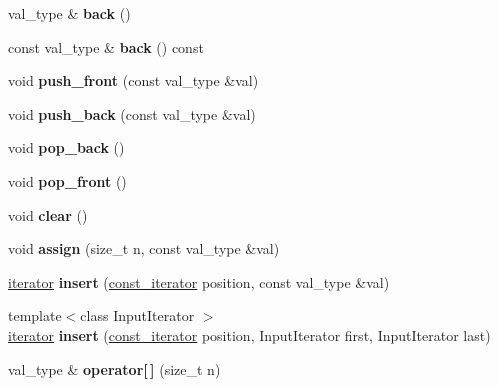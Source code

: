 \begin{DoxyCompactItemize}
val\+\_\+type \& {\bfseries back} ()
\item 
\hypertarget{classdeque_aa87b733006573d31548ee2b00c4c6146}{}\label{classdeque_aa87b733006573d31548ee2b00c4c6146} 
const val\+\_\+type \& {\bfseries back} () const
\item 
\hypertarget{classdeque_aeb97a0199f6d97b25c67cdf255706f93}{}\label{classdeque_aeb97a0199f6d97b25c67cdf255706f93} 
void {\bfseries push\+\_\+front} (const val\+\_\+type \&val)
\item 
\hypertarget{classdeque_a30d370edcc61df0873dea70da51b0f21}{}\label{classdeque_a30d370edcc61df0873dea70da51b0f21} 
void {\bfseries push\+\_\+back} (const val\+\_\+type \&val)
\item 
\hypertarget{classdeque_a058b86dd11d14e61a833f745ba3b69cf}{}\label{classdeque_a058b86dd11d14e61a833f745ba3b69cf} 
void {\bfseries pop\+\_\+back} ()
\item 
\hypertarget{classdeque_ab4ddac9adc62291162d2f8ad724b2166}{}\label{classdeque_ab4ddac9adc62291162d2f8ad724b2166} 
void {\bfseries pop\+\_\+front} ()
\item 
\hypertarget{classdeque_a572cafe1303f6eadd1dbe6fc92c08a23}{}\label{classdeque_a572cafe1303f6eadd1dbe6fc92c08a23} 
void {\bfseries clear} ()
\item 
\hypertarget{classdeque_ad2e31d9c1feb97d21ad782f1c5b198ff}{}\label{classdeque_ad2e31d9c1feb97d21ad782f1c5b198ff} 
void {\bfseries assign} (size\+\_\+t n, const val\+\_\+type \&val)
\item 
\hypertarget{classdeque_a188c35dd65f58513b29f5c10eb49bd11}{}\label{classdeque_a188c35dd65f58513b29f5c10eb49bd11} 
\hyperlink{structdeque__iterator}{iterator} {\bfseries insert} (\hyperlink{structdeque__iterator}{const\+\_\+iterator} position, const val\+\_\+type \&val)
\item 
\hypertarget{classdeque_ab7f1ec9c96276c7e5b98b96d117b293b}{}\label{classdeque_ab7f1ec9c96276c7e5b98b96d117b293b} 
{\footnotesize template$<$class Input\+Iterator $>$ }\\\hyperlink{structdeque__iterator}{iterator} {\bfseries insert} (\hyperlink{structdeque__iterator}{const\+\_\+iterator} position, Input\+Iterator first, Input\+Iterator last)
\item 
\hypertarget{classdeque_a203a46e73cb25b06fd0afa309b2c0c20}{}\label{classdeque_a203a46e73cb25b06fd0afa309b2c0c20} 
val\+\_\+type \& {\bfseries operator\mbox{[}$\,$\mbox{]}} (size\+\_\+t n)
\item 
\hypertarget{classdeque_a3158df56ba89eb4ad9745cb69adf1806}{}\label{classdeque_a3158df56ba89eb4ad9745cb69adf1806} 

\end{DoxyCompactItemize}
